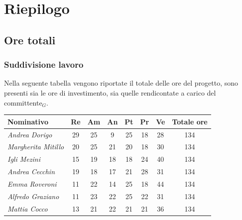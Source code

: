 {{{{{{{{{{\section{Riepilogo}\label{PreventivoRiepilogo}

\subsection{Ore totali}\label{PreventivoRiepilogoOreTotali}

\subsubsection{Suddivisione lavoro}\label{PreventivoRiepilogoOreTotaliSuddivisioneDelLavoro}
Nella seguente tabella vengono riportate il totale delle ore del progetto, sono presenti sia le ore di investimento, sia quelle rendicontate a carico del committente$_G$.
\quad
\def\tabularxcolumn#1{m{#1}}
{

	\begin{center}
		\renewcommand{\arraystretch}{1.4}
		\begin{tabularx}{\textwidth}{|X|c|c|c|c|c|c|c|}
			\hline
			\rowcolor{airforceblue}
			\textbf{Nominativo} & \textbf{Re} & \textbf{Am} & \textbf{An} & \textbf{Pt} & \textbf{Pr} & \textbf{Ve} & \textbf{Totale ore}\\
			\hline
			\textit{Andrea Dorigo} & 29 & 25 & 9 & 25 & 18 & 28 & 134\\
			\hline
			\textit{Margherita Mitillo} & 20 & 25 & 21 & 20 & 18 & 30 & 134\\
			\hline
			\textit{Igli Mezini} & 15 & 19 & 18 & 18 & 24 & 40 & 134\\
			\hline
			\textit{Andrea Cecchin} & 19 & 18 & 17 & 21 & 28 & 31 & 134\\
			\hline
			\textit{Emma Roveroni} & 11 & 22 & 14 & 25 & 18 & 44 & 134\\
			\hline
			\textit{Alfredo Graziano} & 11 & 23 & 22 & 25 & 22 & 31 & 134\\
			\hline
			\textit{Mattia Cocco} & 13 & 21 & 22 & 21 & 21 & 36 & 134\\
			\hline
		\end{tabularx}
	\end{center}

}}}}}}}}}}}
